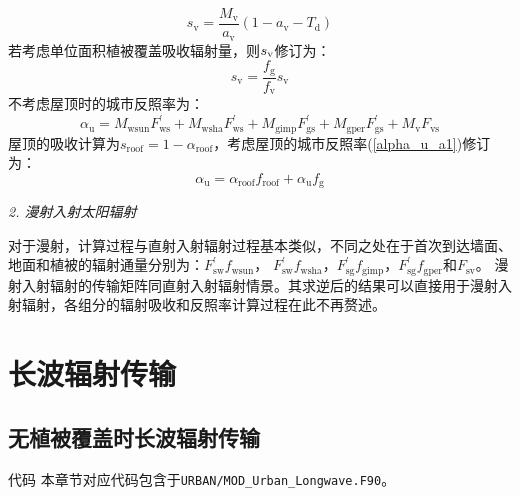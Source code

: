 \begin{equation}
  s_{\mathrm{v}}=\frac{M_{\mathrm{v}}}{a_{\mathrm{v}}}\left(1-a_{\mathrm{v}}-T_{\mathrm{d}}\right)
\end{equation}
若考虑单位面积植被覆盖吸收辐射量，则$s_{\rm v}$修订为：
\begin{equation}
  s_{\mathrm{v}}=\frac{f_{\mathrm{g}}}{f_{\mathrm{v}}} s_{\mathrm{v}}
\end{equation}
不考虑屋顶时的城市反照率为：
\begin{equation}\label{alpha_u_a1}
  \alpha_{\mathrm{u}}=M_{\mathrm{wsun}} F_{\mathrm{ws}}^{\prime}+M_{\mathrm{wsha}} F_{\mathrm{ws}}^{\prime}+M_{\mathrm{gimp}} F_{\mathrm{gs}}^{\prime}+M_{\mathrm{gper}} F_{\mathrm{gs}}^{\prime}+M_{\mathrm{v}} F_{\mathrm{v s}}
\end{equation}
屋顶的吸收计算为$s_{\mathrm{roof}}=1-\alpha_{\mathrm{roof}}$，考虑屋顶的城市反照率(\ref{alpha_u_a1})修订为：
\begin{equation}
  \alpha_{\mathrm{u}}=\alpha_{\mathrm{roof}} f_{\mathrm{roof}}+\alpha_{\mathrm{u}} f_{\mathrm{g}}
\end{equation}

\textit{2. 漫射入射太阳辐射}

对于漫射，计算过程与直射入射辐射过程基本类似，不同之处在于首次到达墙面、地面和植被的辐射通量分别为：$F_{\mathrm{sw}}^\prime f_{\mathrm{wsun}}$，
$F_{\mathrm{sw}}^\prime f_{\mathrm{wsha}}$，$F_{\mathrm{sg}}^\prime f_{\mathrm{gimp}}$，$F_{\mathrm{sg}}^\prime f_{\mathrm{gper}}$和$F_{\mathrm{sv}}$。
漫射入射辐射的传输矩阵同直射入射辐射情景。其求逆后的结果可以直接用于漫射入射辐射，各组分的辐射吸收和反照率计算过程在此不再赘述。

\section{长波辐射传输}
\subsection{无植被覆盖时长波辐射传输}
\begin{mymdframed}{代码}
  本章节对应代码包含于\texttt{URBAN/MOD\_Urban\_Longwave.F90}。
\end{mymdframed}

